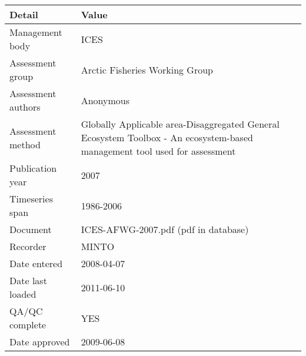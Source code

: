 \begin{table}[htb]
\centering
\begin{tabular}{lp{7cm}}
\toprule
Detail & Value \\
\midrule
Management body    & ICES                                                                                                                      \\
Assessment group   & Arctic Fisheries Working Group                                                                                            \\
Assessment authors & Anonymous                                                                                                                 \\
Assessment method  & Globally Applicable area-Disaggregated General Ecosystem Toolbox - An ecosystem-based management tool used for assessment \\
Publication year   & 2007                                                                                                                      \\
Timeseries span    & 1986-2006                                                                                                                 \\
Document           & ICES-AFWG-2007.pdf (pdf in database)                                                                                      \\
Recorder           & MINTO                                                                                                                     \\
Date entered       & 2008-04-07                                                                                                                \\
Date last loaded   & 2011-06-10                                                                                                                \\
QA/QC complete     & YES                                                                                                                       \\
Date approved      & 2009-06-08                                                                                                                \\
\bottomrule
\end{tabular}
\label{tab:assessdet}
\end{table}

